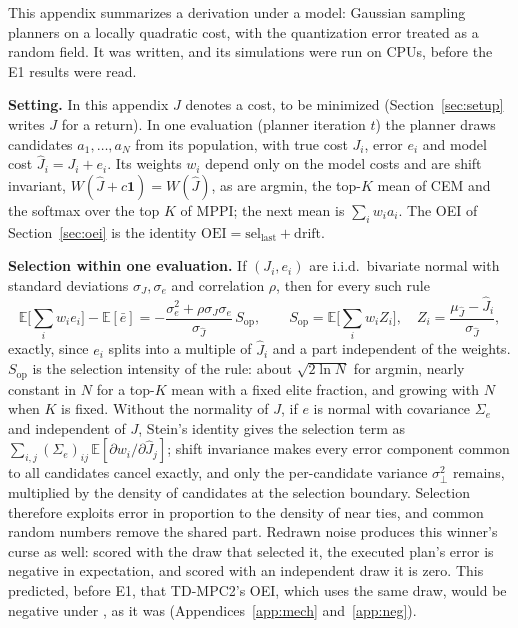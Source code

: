 This appendix summarizes a derivation under a model: Gaussian sampling planners on a locally quadratic cost, with the quantization error treated as a random field. It was written, and its simulations were run on CPUs, before the E1 results were read.

\textbf{Setting.} In this appendix $J$ denotes a cost, to be minimized (Section~\ref{sec:setup} writes $J$ for a return). In one evaluation (planner iteration $t$) the planner draws candidates $a_1,\dots,a_N$ from its population, with true cost $J_i$, error $e_i$ and model cost $\hat J_i=J_i+e_i$. Its weights $w_i$ depend only on the model costs and are shift invariant, $W(\hat J+c\mathbf 1)=W(\hat J)$, as are argmin, the top-$K$ mean of CEM and the softmax over the top $K$ of MPPI; the next mean is $\sum_i w_ia_i$. The OEI of Section~\ref{sec:oei} is the identity $\mathrm{OEI}=\mathrm{sel}_{\mathrm{last}}+\mathrm{drift}$.

\textbf{Selection within one evaluation.} If $(J_i,e_i)$ are i.i.d.\ bivariate normal with standard deviations $\sigma_J,\sigma_e$ and correlation $\rho$, then for every such rule
\[
\mathbb E\Big[\textstyle\sum_i w_ie_i\Big]-\mathbb E[\bar e]=-\frac{\sigma_e^2+\rho\sigma_J\sigma_e}{\sigma_{\hat J}}\,S_{\mathrm{op}},\qquad S_{\mathrm{op}}=\mathbb E\Big[\textstyle\sum_i w_iZ_i\Big],\quad Z_i=\frac{\mu_{\hat J}-\hat J_i}{\sigma_{\hat J}},
\]
exactly, since $e_i$ splits into a multiple of $\hat J_i$ and a part independent of the weights. $S_{\mathrm{op}}$ is the selection intensity of the rule: about $\sqrt{2\ln N}$ for argmin, nearly constant in $N$ for a top-$K$ mean with a fixed elite fraction, and growing with $N$ when $K$ is fixed. Without the normality of $J$, if $e$ is normal with covariance $\Sigma_e$ and independent of $J$, Stein's identity gives the selection term as $\sum_{i,j}(\Sigma_e)_{ij}\,\mathbb E[\partial w_i/\partial\hat J_j]$; shift invariance makes every error component common to all candidates cancel exactly, and only the per-candidate variance $\sigma_\perp^2$ remains, multiplied by the density of candidates at the selection boundary. Selection therefore exploits error in proportion to the density of near ties, and common random numbers remove the shared part. Redrawn noise produces this winner's curse as well: scored with the draw that selected it, the executed plan's error is negative in expectation, and scored with an independent draw it is zero. This predicted, before E1, that TD-MPC2's OEI, which uses the same draw, would be negative under \shiter, as it was (Appendices~\ref{app:mech} and~\ref{app:neg}).


